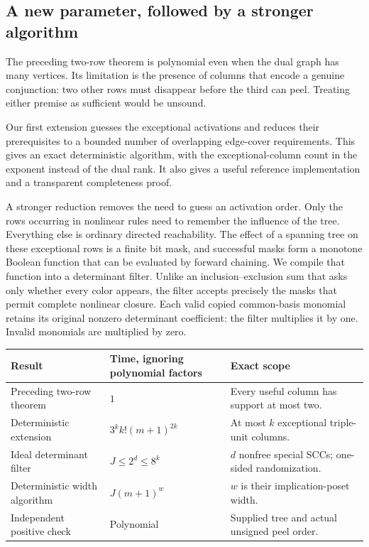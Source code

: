 \subsection{A new parameter, followed by a stronger algorithm}

The preceding two-row theorem is polynomial even when the dual graph has
many vertices.  Its limitation is the presence of columns that encode a
genuine conjunction: two other rows must disappear before the third can
peel.  Treating either premise as sufficient would be unsound.

Our first extension guesses the exceptional activations and reduces their
prerequisites to a bounded number of overlapping edge-cover requirements.
This gives an exact deterministic algorithm, with the exceptional-column
count in the exponent instead of the dual rank.  It also gives a useful
reference implementation and a transparent completeness proof.

A stronger reduction removes the need to guess an activation order.  Only
the rows occurring in nonlinear rules need to remember the influence of
the tree.  Everything else is ordinary directed reachability.  The effect
of a spanning tree on these exceptional rows is a finite bit mask, and
successful masks form a monotone Boolean function that can be evaluated
by forward chaining.  We compile that function into a determinant filter.
Unlike an inclusion--exclusion sum that asks only whether every color
appears, the filter accepts precisely the masks that permit complete
nonlinear closure.  Each valid copied common-basis monomial retains its
original nonzero determinant coefficient: the filter multiplies it by one.
Invalid monomials are multiplied by zero.

\begin{center}
\begin{tabular}{P{0.26\textwidth}P{0.28\textwidth}P{0.36\textwidth}}
\toprule
Result & Time, ignoring polynomial factors & Exact scope\\
\midrule
Preceding two-row theorem & $1$ & Every useful column has support at most two.\\
Deterministic extension & $3^k k!(m+1)^{2k}$ & At most $k$ exceptional triple-unit columns.\\
Ideal determinant filter & $J\leq2^d\leq8^k$ & $d$ nonfree special SCCs; one-sided randomization.\\
Deterministic width algorithm & $J(m+1)^w$ & $w$ is their implication-poset width.\\
Independent positive check & Polynomial & Supplied tree and actual unsigned peel order.\\
\bottomrule
\end{tabular}
\end{center}

